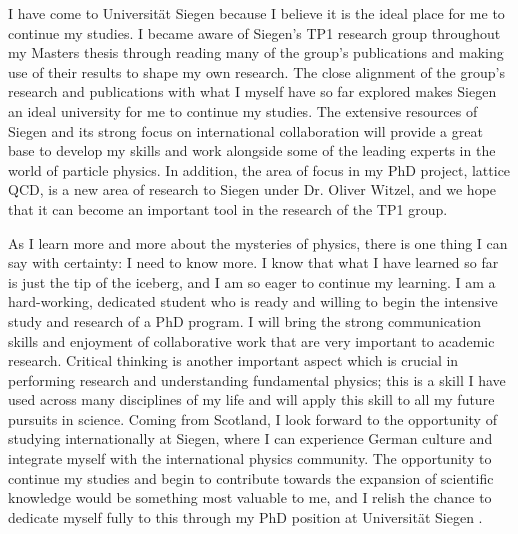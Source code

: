 \documentclass[11pt, a4paper]{awesome-cv}
\newcommand\uni{Universit\"{a}t Siegen }
\begin{document}
\begin{cvletter}
I have come to Universit\"{a}t Siegen because I believe it is the ideal place for me to continue my studies. 
I became aware of Siegen's TP1 research group throughout my Masters thesis through reading many of the group's publications and making use of their results to shape my own research. 
The close alignment of the group's research and publications with what I myself have so far explored makes Siegen an ideal university for me to continue my studies. 
The extensive resources of Siegen and its strong focus on international collaboration will provide a great base to develop my skills and work alongside some of the leading experts in the world of particle physics. 
In addition, the area of focus in my PhD project, lattice QCD, is a new area of research to Siegen under Dr. Oliver Witzel, and we hope that it can become an important tool in the research of the TP1 group.

As I learn more and more about the mysteries of physics, there is one thing I can say with certainty: I need to know more. 
I know that what I have learned so far is just the tip of the iceberg, and I am so eager to continue my learning. 
I am a hard-working, dedicated student who is ready and willing to begin the intensive study and research of a PhD program. 
I will bring the strong communication skills and enjoyment of collaborative work that are very important to academic research. 
Critical thinking is another important aspect which is crucial in performing research and understanding fundamental physics; this is a skill I have used across many disciplines of my life and will apply this skill to all my future pursuits in science.
Coming from Scotland, I look forward to the opportunity of studying internationally at Siegen, where I can experience German culture and integrate myself with the international physics community.
The opportunity to continue my studies and begin to contribute towards the expansion of scientific knowledge would be something most valuable to me, and I relish the chance to dedicate myself fully to this through my PhD position at \uni. 

\end{cvletter}

\makeletterclosing
\end{document}
